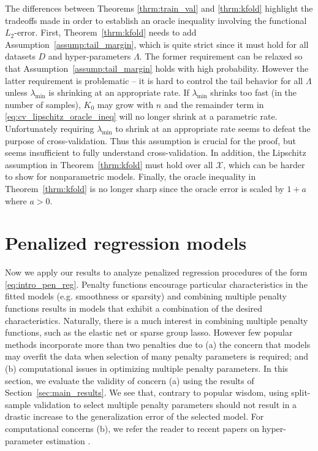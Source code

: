 \documentclass[12pt]{article} %
\theoremstyle{definition}
\begin{document}
The differences between Theorems \ref{thrm:train_val} and \ref{thrm:kfold} highlight the tradeoffs made in order to establish an oracle inequality involving the functional $L_2$-error.
First, Theorem~\ref{thrm:kfold} needs to add Assumption~\ref{assump:tail_margin}, which is quite strict since it must hold for all datasets $D$ and hyper-parameters $\Lambda$.
The former requirement can be relaxed so that Assumption~\ref{assump:tail_margin} holds with high probability.
However the latter requirement is problematic -- it is hard to control the tail behavior for all $\Lambda$ unless $\lambda_{\min}$ is shrinking at an appropriate rate.
If $\lambda_{\min}$ shrinks too fast (in the number of samples), $K_0$ may grow with $n$ and the remainder term in \eqref{eq:cv_lipschitz_oracle_ineq} will no longer shrink at a parametric rate.
Unfortunately requiring $\lambda_{\min}$ to shrink at an appropriate rate seems to defeat the purpose of cross-validation.
Thus this assumption is crucial for the proof, but seems insufficient to fully understand cross-validation.
In addition, the Lipschitz assumption in Theorem~\ref{thrm:kfold} must hold over all $\mathcal{X}$, which can be harder to show for nonparametric models.
Finally, the oracle inequality in Theorem~\ref{thrm:kfold} is no longer sharp since the oracle error is scaled by $1+a$ where $a > 0$.

\section{Penalized regression models}
\label{sec:examples}
Now we apply our results to analyze penalized regression procedures of the form \eqref{eq:intro_pen_reg}.
Penalty functions encourage particular characteristics in the fitted models (e.g. smoothness or sparsity) and combining multiple penalty functions results in models that exhibit a combination of the desired characteristics. 
Naturally, there is a much interest in combining multiple penalty functions, such as the elastic net or sparse group lasso.
However few popular methods incorporate more than two penalties due to (a) the concern that models may overfit the data when selection of many penalty parameters is required; and (b) computational issues in optimizing multiple penalty parameters. In this section, we evaluate the validity of concern (a) using the results of Section~\ref{sec:main_results}. We see that, contrary to popular wisdom, using split-sample validation to select multiple penalty parameters should not result in a drastic increase to the generalization error of the selected model. For computational concerns (b), we refer the reader to recent papers on hyper-parameter estimation \citep{bengio2000gradient, foo2008efficient, snoek2012practical}.
\end{document}
